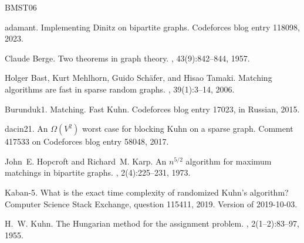 \documentclass[10pt]{article}
\begin{document}
\begin{thebibliography}{BMST06}

{adamant}.
\newblock Implementing {D}initz on bipartite graphs.
\newblock Codeforces blog entry 118098, 2023.

Claude Berge.
\newblock Two theorems in graph theory.
,
  43(9):842--844, 1957.

Holger Bast, Kurt Mehlhorn, Guido Sch\"{a}fer, and Hisao Tamaki.
\newblock Matching algorithms are fast in sparse random graphs.
, 39(1):3--14, 2006.

{Burunduk1}.
\newblock Matching. {F}ast {K}uhn.
\newblock Codeforces blog entry 17023, in Russian, 2015.

{dacin21}.
\newblock An {$\Omega(V^2)$} worst case for blocking {K}uhn on a sparse graph.
\newblock Comment 417533 on Codeforces blog entry 58048, 2017.

John~E. Hopcroft and Richard~M. Karp.
\newblock An {$n^{5/2}$} algorithm for maximum matchings in bipartite graphs.
, 2(4):225--231, 1973.

{Kaban-5}.
\newblock What is the exact time complexity of randomized {K}uhn's algorithm?
\newblock Computer Science Stack Exchange, question 115411, 2019.
\newblock Version of 2019-10-03.

H.~W. Kuhn.
\newblock The {H}ungarian method for the assignment problem.
, 2(1--2):83--97, 1955.

\end{thebibliography}
\end{document}

